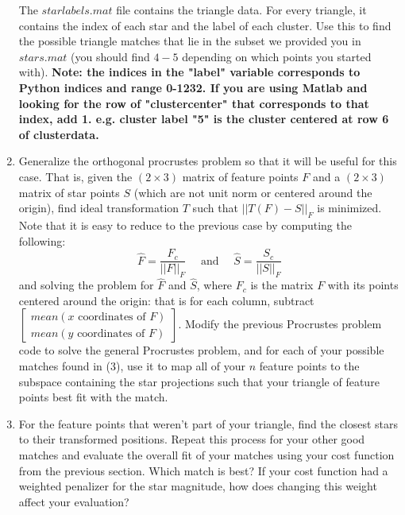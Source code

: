 \documentclass[paper=a4, fontsize=11pt]{scrartcl} %
\begin{document}
\begin{enumerate}
    The $starlabels.mat$ file contains the triangle data. For every triangle, it contains the index of each star and the label of each cluster. Use this to find the possible triangle matches that lie in the subset we provided you in $stars.mat$ (you should find $4-5$ depending on which points you started with).  \textbf{Note: the indices in the "label" variable corresponds to Python indices and range 0-1232. If you are using Matlab and looking for the row of "clustercenter" that corresponds to that index, add 1. e.g. cluster label "5" is the cluster centered at row 6 of clusterdata.}
  \item
  Generalize the orthogonal procrustes problem so that it will be useful for this case. That is, given the $(2\times 3)$ matrix of feature points $F$ and a  $(2\times 3)$ matrix of star points $S$ (which are not unit norm or centered around the origin), find ideal transformation $T$ such that $||T(F)-S||_F$ is minimized.  Note that it is easy to reduce to the previous case by computing the following:
  $$
  \hat{F} = \frac{F_c}{||F||_F} \quad\textrm{ and }\quad\hat{S} = \frac{S_c}{||S||_F}
  $$
  and solving the problem for $\hat{F}$ and $\hat{S}$, where $F_c$ is the matrix $F$ with its points centered around the origin: that is for each column, subtract $\begin{bmatrix}
mean(x \textrm{ coordinates of } F)\\
mean(y \textrm{ coordinates of } F)
  \end{bmatrix}$. Modify the previous Procrustes problem code to solve the general Procrustes problem, and for each of your possible matches found in (3), use it to map all of your $n$ feature points to the subspace containing the star projections such that your triangle of feature points best fit with the match.
  \item
  For the feature points that weren't part of your triangle, find the closest stars to their transformed positions. Repeat this process for your other good matches and evaluate the overall fit of your matches using your cost function from the previous section. Which match is best? If your cost function had a weighted penalizer for the star magnitude, how does changing this weight affect your evaluation?
\end{enumerate}

\end{document}
